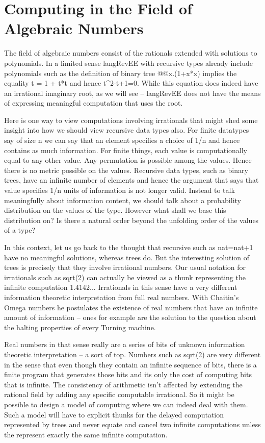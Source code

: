 \documentclass[preprint]{sigplanconf}
\begin{document}
\section{Computing in the Field of Algebraic Numbers}

The field of algebraic numbers consist of the rationals extended with
solutions to polynomials. In a limited sense {{langRevEE}} with
recursive types already include polynomials such as the definition of
binary tree {{@@x.(1+x*x)}} implies the equality {{t = 1 + t*t}} and
hence {{t^2-t+1=0}}. While this equation does indeed have an
irrational imaginary root, as we will see -- {{langRevEE}} does not
have the means of expressing meaningful computation that uses the
root.

Here is one way to view computations involving irrationals that might
shed some insight into how we should view recursive data types
also. For finite datatypes say of size {{n}} we can say that an
element specifies a choice of {{1/n}} and hence contains as much
information. For finite things, each value is computationally equal to
any other value. Any permutation is possible among the values. Hence
there is no metric possible on the values.  Recursive data types, such
as binary trees, have an infinite number of elements and hence the
argument that says that value specifies {{1/n}} units of information
is not longer valid. Instead to talk meaningfully about information
content, we should talk about a probability distribution on the values
of the type. However what shall we base this distribution on? Is there
a natural order beyond the unfolding order of the values of a type? 

In this context, let us go back to the thought that recursive such as
{{nat=nat+1}} have no meaningful solutions, whereas trees do. But the
interesting solution of trees is precisely that they involve
irrational numbers. Our usual notation for irrationals such as
{{sqrt(2) }} can actually be viewed as a thunk representing the
infinite computation {{1.4142..}}. Irrationals in this sense have a
very different information theoretic interpretation from full real
numbers. With Chaitin's Omega numbers he postulates the existence of
real numbers that have an infinite amount of information -- ones for
example are the solution to the question about the halting properties
of every Turning machine. 

Real numbers in that sense really are a series of bits of unknown
information theoretic interpretation -- a sort of {{top}}. Numbers
such as {{sqrt(2) }} are very different in the sense that even though
they contain an infinite sequence of bits, there is a finite program
that generates those bits and its only the cost of computing bits that
is infinite.  The consistency of arithmetic isn't affected by
extending the rational field by adding any specific computable
irrational. So it might be possible to design a model of computing
where we can indeed deal with them. Such a model will have to explicit
thunks for the delayed computation represented by trees and never
equate and cancel two infinite computations unless the represent
exactly the same infinite computation.
\end{document}
